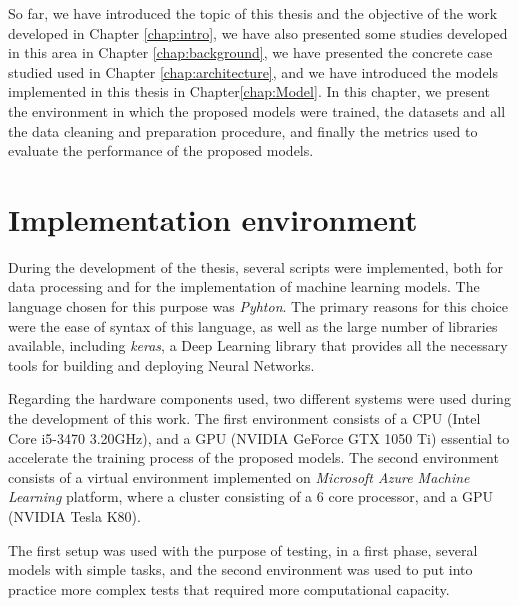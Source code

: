 \cleardoublepage
\label{chap:implementation}

So far, we have introduced the topic of this thesis and the objective of the work developed in Chapter \ref{chap:intro}, we have also presented some studies developed in this area in Chapter \ref{chap:background}, we have presented the concrete case studied used in Chapter \ref{chap:architecture}, and we have introduced the models implemented in this thesis in Chapter\ref{chap:Model}.
In this chapter, we present the environment in which the proposed models were trained, the datasets and all the data cleaning and preparation procedure, and finally the metrics used to evaluate the performance of the proposed models.
 

\section{Implementation environment} \label{chap5:enviromnet}

During the development of the thesis, several scripts were implemented, both for data processing and for the implementation of machine learning models. The language chosen for this purpose was \textit{Pyhton}. The primary reasons for this choice were the ease of syntax of this language, as well as the large number of libraries available, including \textit{keras}, a Deep Learning library that provides all the necessary tools for building and deploying Neural Networks.

Regarding the hardware components used, two different systems were used during the development of this work. The first environment consists of a CPU (Intel Core i5-3470 3.20GHz), and a GPU (NVIDIA GeForce GTX 1050 Ti) essential to accelerate the training process of the proposed models. The second environment consists of a virtual environment implemented on \textit{Microsoft Azure Machine Learning} platform, where a cluster consisting of a 6 core processor, and a GPU (NVIDIA Tesla K80).

The first setup was used with the purpose of testing, in a first phase, several models with simple tasks, and the second environment was used to put into practice more complex tests that required more computational capacity.
	

